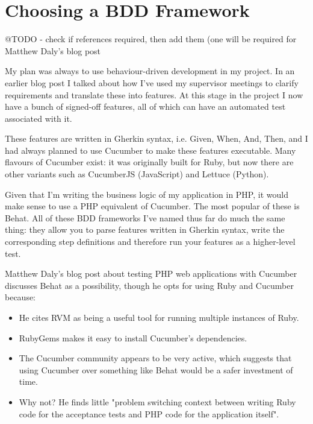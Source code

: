 \chapter{Choosing a BDD Framework} \label{appendix:bdd}

@TODO - check if references required, then add them (one will be required for Matthew Daly's blog post

My plan was always to use behaviour-driven development in my project. In an earlier blog post I talked about how I've used my supervisor meetings to clarify requirements and translate these into features. At this stage in the project I now have a bunch of signed-off features, all of which can have an automated test associated with it.

These features are written in Gherkin syntax, i.e. Given, When, And, Then, and I had always planned to use Cucumber to make these features executable. Many flavours of Cucumber exist: it was originally built for Ruby, but now there are other variants such as CucumberJS (JavaScript) and Lettuce (Python).

Given that I'm writing the business logic of my application in PHP, it would make sense to use a PHP equivalent of Cucumber. The most popular of these is Behat. All of these BDD frameworks I've named thus far do much the same thing: they allow you to parse features written in Gherkin syntax, write the corresponding step definitions and therefore run your features as a higher-level test.

Matthew Daly's blog post about testing PHP web applications with Cucumber discusses Behat as a possibility, though he opts for using Ruby and Cucumber because:

\begin{itemize}
    \item He cites RVM as being a useful tool for running multiple instances of Ruby.

    \item RubyGems makes it easy to install Cucumber's dependencies.

    \item The Cucumber community appears to be very active, which suggests that using Cucumber over something like Behat would be a safer investment of time.

    \item Why not? He finds little "problem switching context between writing Ruby code for the acceptance tests and PHP code for the application itself".
\end{itemize}

